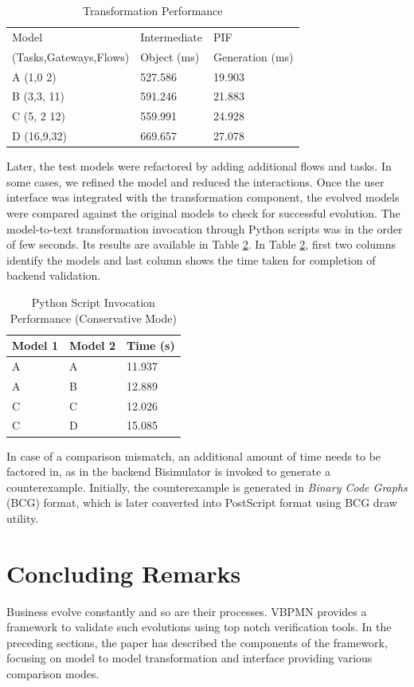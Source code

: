 \documentclass{article}
\begin{document}
\begin{table}[htp]
\centering
\begin{tabular}{|l|l|l|}
\hline
Model & Intermediate & PIF\\
(Tasks,Gateways,Flows) & Object (ms) & Generation (ms)\\
\hline
A (1,0 2) &527.586 &19.903\\
\hline
B (3,3, 11) &591.246 &21.883\\
\hline
C (5, 2 12) &559.991 &24.928\\
\hline
D (16,9,32) &669.657 &27.078\\
\hline
\end{tabular}
\caption{Transformation Performance}
\label{tab:perf}
\end{table}
Later, the test models were refactored by adding additional flows and tasks. In some cases, we refined the model and reduced the interactions. Once the user interface was integrated with the transformation component, the evolved models were compared against the original models to check for successful evolution. The model-to-text transformation invocation through Python scripts was in the order of few seconds. Its results are available in Table \ref{tab:pyperf}. In Table \ref{tab:pyperf}, first two columns identify the models and last column shows the time taken for completion of backend validation.
\begin{table}[htp]
\centering
\begin{tabular}{|l|l|l|}
\hline
Model 1 & Model 2 & Time (s)\\
\hline
A &A &11.937\\
\hline
A &B &12.889\\
\hline
C &C &12.026\\
\hline
C &D &15.085\\
\hline
\end{tabular}
\caption{Python Script Invocation Performance (Conservative Mode)}
\label{tab:pyperf}
\end{table}
In case of a comparison mismatch, an additional amount of time needs to be factored in, as in the backend Bisimulator \cite{Bisim:Ref} is invoked to generate a counterexample. Initially, the counterexample is generated in \textit{Binary Code Graphs} (BCG) format, which is later converted into PostScript format using BCG draw utility. 
 

\section{Concluding Remarks}
Business evolve constantly and so are their processes. VBPMN provides a framework to validate such evolutions using top notch verification tools. In the preceding sections, the paper has described the components of the framework, focusing on model to model transformation and interface providing various comparison modes. 
 
\end{document}
